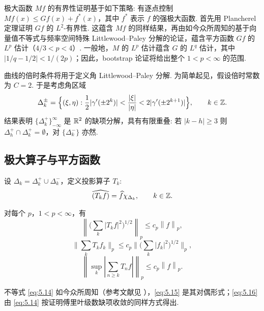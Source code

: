 极大函数 $Mf$ 的有界性证明基于如下策略: 有逐点控制 $M f(x) \leq G f(x) + f^*(x)$，其中 $f^*$ 表示 $f$ 的强极大函数. 首先用 Plancherel 定理证明 $Gf$ 的 $L^2$-有界性. 这蕴含 $Mf$ 的同样结果，再由如今众所周知的基于向量值不等式与频率空间特殊 Littlewood--Paley 分解的论证，蕴含平方函数 $Gf$ 的 $L^p$ 估计（$4/3 < p < 4$）. 一般地，$M$ 的 $L^p$ 估计蕴含 $G$ 的 $L^q$ 估计，其中 $|1/q - 1/2| < 1/(2p)$；因此，bootstrap 论证将给出整个 $1 < p < \infty$ 的范围.

曲线的倍时条件将用于定义角 Littlewood--Paley 分解. 为简单起见，假设倍时常数为 $C = 2$. 于是考虑角区域
\begin{align*}
  \Delta_{k}^{\pm}=\Big\{(\xi,\eta):
  \frac{1}{2}|\gamma^{\prime}(\pm 2^{k})|<\frac{|\xi|}{|\eta|}<2|\gamma^{\prime}(\pm 2^{k+1})|\Big\},\qquad k\in\mathbb{Z}.
\end{align*}
结果表明 $\{\Delta_k^+\}_{-\infty}^{\infty}$ 是 $\mathbb{R}^2$ 的缺项分解，具有有限重叠: 若 $|k - h| \geq 3$ 则 $\Delta_h^+ \cap \Delta_k^+ = \emptyset$，对 $\{\Delta_k^-\}$ 亦然.

\subsection{极大算子与平方函数}

设 $\Delta_{k} = \Delta_{k}^{+} \cup \Delta_{k}^{-}$，定义投影算子 $T_{k}$:
\begin{align*}
  \widehat{(T_{k}f)}=\widehat{f}\chi_{\Delta_{k}},\qquad k\in\mathbb{Z}.
\end{align*}

\begin{lemma}\label{lem:5.23}
对每个 $p$，$1 < p < \infty$，有
\begin{equation}\label{eq:5.14}
  \left\|\Big(\sum_{k}\left|T_{k}f\right|^{2}\Big)^{1/2}\right\|_{p}\leq c_{p}\left\|f\right\|_{p},
\end{equation}
\begin{equation}\label{eq:5.15}
  \Big\|\sum_{k}T_{k}f_{k}\Big\|_{p}\leq c_{p}\Big\|\Big(\sum_{k}|f_{k}|^{2}\Big)^{1/2}\Big\|_{p},
\end{equation}
\begin{equation}\label{eq:5.16}
  \left\|\sup_{k}\left|\sum_{n\geq k}T_{n}f\right|\right\|_{p}\leq c_{p}\left\|f\right\|_{p}.
\end{equation}
\end{lemma}

不等式 \eqref{eq:5.14} 如今众所周知（参考文献见 \cite{b98}），\eqref{eq:5.15} 是其对偶形式；\eqref{eq:5.16} 由 \eqref{eq:5.14} 按证明傅里叶级数缺项收敛的同样方式得出.

